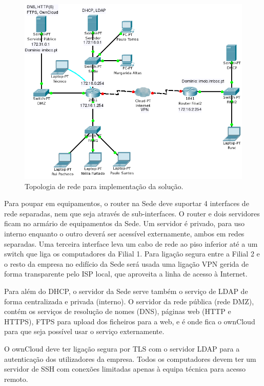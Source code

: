 \documentclass[12pt,a4paper]{report}
\begin{document}
~
\begin{figure}[H]
\begin{center}
\includegraphics[width=\textwidth]{figs/diagrama-deployment.png}
\end{center}
\caption{Topologia de rede para implementação da solução.}
\label{fig:deployment}
\end{figure}

Para poupar em equipamentos, o router na Sede deve suportar 4 interfaces de rede separadas, nem que seja através de sub-interfaces. O router e dois servidores ficam no armário de equipamentos da Sede. Um servidor é privado, para uso interno enquanto o outro deverá ser acessível externamente, ambos em redes separadas. Uma terceira interface leva um cabo de rede ao piso inferior até a um switch que liga os computadores da Filial 1. Para ligação segura entre a Filial 2 e o resto da empresa no edifício da Sede será usada uma ligação VPN gerida de forma transparente pelo ISP local, que aproveita a linha de acesso à Internet.

Para além do DHCP, o servidor da Sede serve também o serviço de LDAP de forma centralizada e privada (interno). O servidor da rede pública (rede DMZ), contém os serviços de resolução de nomes (DNS), páginas web (HTTP e HTTPS), FTPS para upload dos ficheiros para a web, e é onde fica o ownCloud para que seja possível usar o serviço externamente.

O ownCloud deve ter ligação segura por TLS com o servidor LDAP para a autenticação dos utilizadores da empresa. Todos os computadores devem ter um servidor de SSH com conexões limitadas apenas à equipa técnica para acesso remoto.
\end{document}
